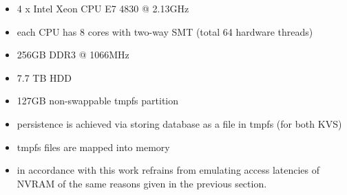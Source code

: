 \begin{itemize}
    \item 4 x Intel Xeon CPU E7 4830 @ 2.13GHz
    \item each CPU has 8 cores with two-way SMT (total 64 hardware threads)
    \item 256GB DDR3 @ 1066MHz
    \item 7.7 TB HDD
    \item 127GB non-swappable tmpfs partition
    \item persistence is achieved via storing database as a file in tmpfs (for both KVS)
    \item tmpfs files are mapped into memory
    \item in accordance with \cite{bailey2013exploring, zhou2016nvht} this work refrains from emulating access latencies of NVRAM of the same reasons given in the previous section.
\end{itemize}
